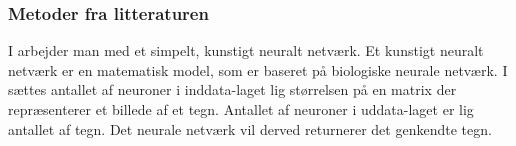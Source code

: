 
\subsubsection*{Metoder fra litteraturen}

I \cite{kwas} arbejder man med et simpelt, kunstigt neuralt netværk. Et kunstigt neuralt netværk er en matematisk model, som er baseret på biologiske neurale netværk\cite{wiki_nn}. I \cite{kwas} sættes antallet af neuroner i inddata-laget lig størrelsen på en matrix der repræsenterer et billede af et tegn. Antallet af neuroner i uddata-laget er lig antallet af tegn. Det neurale netværk vil derved returnerer det genkendte tegn.
